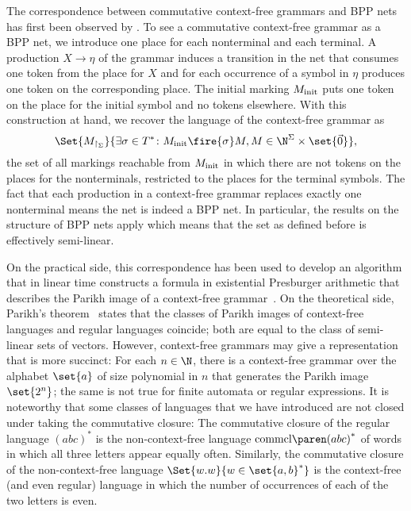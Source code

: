 \documentclass[../../diss.tex]{subfiles}
\begin{document}
The correspondence between commutative context-free grammars and BPP nets has first been observed by .
To see a commutative context-free grammar as a BPP net, we introduce one place for each nonterminal and each terminal.
A production $X \to \eta$ of the grammar induces a transition in the net that consumes one token from the place for $X$ and for each occurrence of a symbol in $\eta$ produces one token on the corresponding place.
The initial marking $M_{\text{init}}$ puts one token on the place for the initial symbol and no tokens elsewhere.
With this construction at hand, we recover the language of the context-free grammar as
\[
    \Set{ M_{\restriction_{\Sigma}} }{ \exists \sigma \in T^* \colon \Minit \fire{\sigma} M, M \in \N^{\Sigma} \times \set{ \vec{0}}},
\]
the set of all markings reachable from $M_{\text{init}}$ in which there are not tokens on the places for the nonterminals, restricted to the places for the terminal symbols.
The fact that each production in a context-free grammar replaces exactly one nonterminal means the net is indeed a BPP net.
In particular, the results on the structure of BPP nets apply which means that the set as defined before is effectively semi-linear.

On the practical side, this correspondence has been used to develop an algorithm that in linear time constructs a formula in existential Presburger arithmetic that describes the Parikh image of a context-free grammar~\cite{VermaSS05}.
On the theoretical side, Parikh's theorem~\cite{Parikh66} states that the classes of Parikh images of context-free languages and regular languages coincide; both are equal to the class of semi-linear sets of vectors.
However, context-free grammars may give a representation that is more succinct:
For each $n \in \N$, there is a context-free grammar over the alphabet $\set{a}$ of size polynomial in $n$ that generates the Parikh image $\set{2^n}$; the same is not true for finite automata or regular expressions.
It is noteworthy that some classes of languages that we have introduced are not closed under taking the commutative closure:
The commutative closure of the regular language ${(abc)}^*$ is the non-context-free language $\commclosure{{(abc)}^*}$ of words in which all three letters appear equally often.
Similarly, the commutative closure of the non-context-free language $\Set{ w.w }{ w \in \set{a,b}^*}$ is the context-free (and even regular) language in which the number of occurrences of each of the two letters is even.
\end{document}
